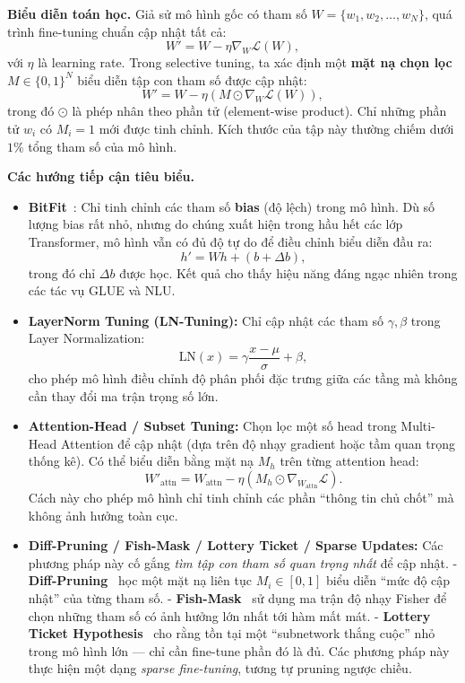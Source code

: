 \textbf{Biểu diễn toán học.}  
Giả sử mô hình gốc có tham số $W = \{w_1, w_2, \dots, w_N\}$, quá trình fine-tuning chuẩn cập nhật tất cả:
\[
W' = W - \eta \nabla_W \mathcal{L}(W),
\]
với $\eta$ là learning rate.  
Trong selective tuning, ta xác định một \textbf{mặt nạ chọn lọc} $M \in \{0,1\}^N$ biểu diễn tập con tham số được cập nhật:
\[
W' = W - \eta (M \odot \nabla_W \mathcal{L}(W)),
\]
trong đó $\odot$ là phép nhân theo phần tử (element-wise product).  
Chỉ những phần tử $w_i$ có $M_i = 1$ mới được tinh chỉnh.  
Kích thước của tập này thường chiếm dưới $1\%$ tổng tham số của mô hình.

\textbf{Các hướng tiếp cận tiêu biểu.}
\begin{itemize}
	\item \textbf{BitFit}~\cite{zaken2021bitfit}:  
	Chỉ tinh chỉnh các tham số \textbf{bias} (độ lệch) trong mô hình.  
	Dù số lượng bias rất nhỏ, nhưng do chúng xuất hiện trong hầu hết các lớp Transformer, mô hình vẫn có đủ độ tự do để điều chỉnh biểu diễn đầu ra:
	\[
	h' = W h + (b + \Delta b),
	\]
	trong đó chỉ $\Delta b$ được học.  
	Kết quả cho thấy hiệu năng đáng ngạc nhiên trong các tác vụ GLUE và NLU.
	
	\item \textbf{LayerNorm Tuning (LN-Tuning):}
	Chỉ cập nhật các tham số $\gamma, \beta$ trong Layer Normalization:  
	\[
	\text{LN}(x) = \gamma \frac{x - \mu}{\sigma} + \beta,
	\]
	cho phép mô hình điều chỉnh độ phân phối đặc trưng giữa các tầng mà không cần thay đổi ma trận trọng số lớn.
	
	\item \textbf{Attention-Head / Subset Tuning\cite{ansell2022composable}:}  
	Chọn lọc một số head trong Multi-Head Attention để cập nhật (dựa trên độ nhạy gradient hoặc tầm quan trọng thống kê).  
	Có thể biểu diễn bằng mặt nạ $M_h$ trên từng attention head:
	\[
	W'_{\text{attn}} = W_{\text{attn}} - \eta (M_h \odot \nabla_{W_{\text{attn}}} \mathcal{L}).
	\]
	Cách này cho phép mô hình chỉ tinh chỉnh các phần “thông tin chủ chốt” mà không ảnh hưởng toàn cục.
	
	\item \textbf{Diff-Pruning / Fish-Mask / Lottery Ticket / Sparse Updates:}  
	Các phương pháp này cố gắng \emph{tìm tập con tham số quan trọng nhất} để cập nhật.  
	- \textbf{Diff-Pruning}~\cite{guo2021parameter} học một mặt nạ liên tục $M_i \in [0,1]$ biểu diễn “mức độ cập nhật” của từng tham số.  
	- \textbf{Fish-Mask}~\cite{sung2022fishmask} sử dụng ma trận độ nhạy Fisher để chọn những tham số có ảnh hưởng lớn nhất tới hàm mất mát.  
	- \textbf{Lottery Ticket Hypothesis}~\cite{frankle2019lottery} cho rằng tồn tại một “subnetwork thắng cuộc” nhỏ trong mô hình lớn — chỉ cần fine-tune phần đó là đủ.  
	Các phương pháp này thực hiện một dạng \textit{sparse fine-tuning}, tương tự pruning ngược chiều.
\end{itemize}

